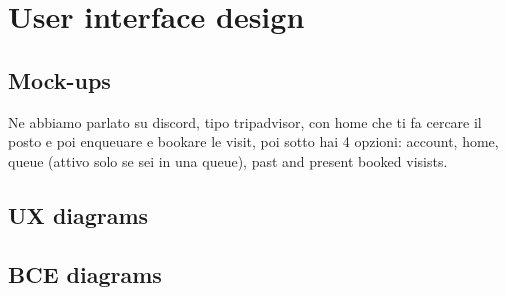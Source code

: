\section{User interface design}
\label{sect:userinterfacedesign}

\subsection{Mock-ups}
\label{subsect:mockups}

Ne abbiamo parlato su discord, tipo tripadvisor, con home che ti fa cercare il posto e poi enqueuare e bookare le visit, poi sotto hai 4 opzioni: account, home, queue (attivo solo se sei in una queue), past and present booked visists.

\subsection{UX diagrams}
\label{subsect:userexpirience}

\subsection{BCE diagrams}
\label{subsect:BCEdiagrams}